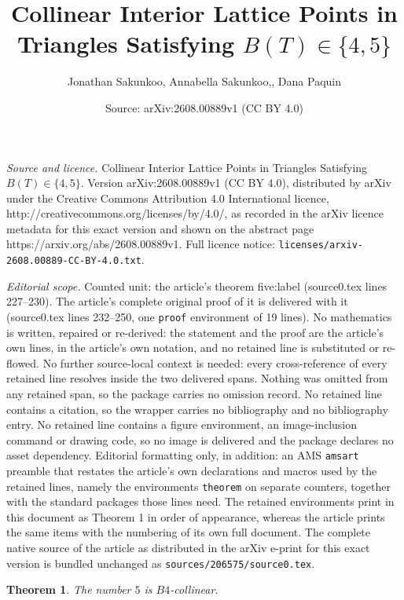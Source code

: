 \documentclass[10pt,a4paper]{amsart}
\title{Collinear Interior Lattice Points in Triangles Satisfying $B(T)\in\{4,5\}$}
\author{Jonathan Sakunkoo, Annabella Sakunkoo,, Dana Paquin}
\date{Source: arXiv:2608.00889v1 (CC BY 4.0)}
\newtheorem{theorem}{Theorem}
\begin{document}
\maketitle

\noindent\emph{Source and licence.} Collinear Interior Lattice Points in Triangles Satisfying $B(T)\in\{4,5\}$. Version arXiv:2608.00889v1 (CC BY 4.0), distributed by arXiv under the Creative Commons Attribution 4.0 International licence, http://creativecommons.org/licenses/by/4.0/, as recorded in the arXiv licence metadata for this exact version and shown on the abstract page https://arxiv.org/abs/2608.00889v1. Full licence notice: \texttt{licenses/arxiv-2608.00889-CC-BY-4.0.txt}.\par\smallskip

\noindent\textit{Editorial scope.} Counted unit: the article's theorem five:label (source0.tex lines 227--230). The article's complete original proof of it is delivered with it (source0.tex lines 232--250, one \texttt{proof} environment of 19 lines). No mathematics is written, repaired or re-derived: the statement and the proof are the article's own lines, in the article's own notation, and no retained line is substituted or re-flowed.  No further source-local context is needed: every cross-reference of every retained line resolves inside the two delivered spans.  Nothing was omitted from any retained span, so the package carries no omission record.  No retained line contains a citation, so the wrapper carries no bibliography and no bibliography entry.  No retained line contains a figure environment, an image-inclusion command or drawing code, so no image is delivered and the package declares no asset dependency.  Editorial formatting only, in addition: an AMS \texttt{amsart} preamble that restates the article's own declarations and macros used by the retained lines, namely the environments \texttt{theorem} on separate counters, together with the standard packages those lines need.  The retained environments print in this document as Theorem 1 in order of appearance, whereas the article prints the same items with the numbering of its own full document.  The complete native source of the article as distributed in the arXiv e-print for this exact version is bundled unchanged as \texttt{sources/206575/source0.tex}.
\begin{theorem}
\label{five:label}
The number $5$ is $B4$-collinear. 
\end{theorem}
\end{document}

